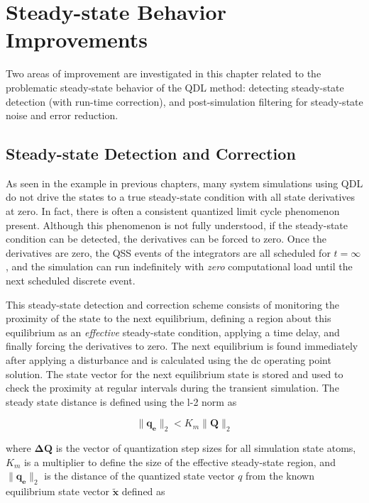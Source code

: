 
\chapter{Steady-state Behavior Improvements}\label{chap:steadystate}

Two areas of improvement are investigated in this chapter related to the problematic steady-state behavior of the QDL method: detecting steady-state detection (with run-time correction), and post-simulation filtering for steady-state noise and error reduction.

\section{Steady-state Detection and Correction}

As seen in the example in previous chapters, many system simulations using QDL do not drive the states to a true steady-state condition with all state derivatives at zero. In fact, there is often a consistent quantized limit cycle phenomenon present. Although this phenomenon is not fully understood, if the steady-state condition can be detected, the derivatives can be forced to zero. Once the derivatives are zero, the QSS events of the integrators are all scheduled for $t=\infty$, and the simulation can run indefinitely with \emph{zero} computational load until the next scheduled discrete event.

This steady-state detection and correction scheme consists of monitoring the proximity of the state to the next equilibrium, defining a region about this equilibrium as an \emph{effective} steady-state condition, applying a time delay, and finally forcing the derivatives to zero. The next equilibrium is found immediately after applying a disturbance and is calculated using the dc operating point solution. The state vector for the next equilibrium state is stored and used to check the proximity at regular intervals during the transient simulation. The steady state distance is defined using the l-2 norm as 

\begin{equation} \label{eq:ss_check}
    \| \mathbf{q_e} \|_2 < K_m \| \mathbf{Q} \|_2
\end{equation}

where $\mathbf{\Delta Q}$ is the vector of quantization step sizes for all simulation state atoms, $K_m$ is a multiplier to define the size of the effective steady-state region, and $\| \mathbf{q_e} \|_2$ is the distance of the quantized state vector $q$ from the known equilibrium state vector $\mathbf{\tilde{x}}$ defined as

